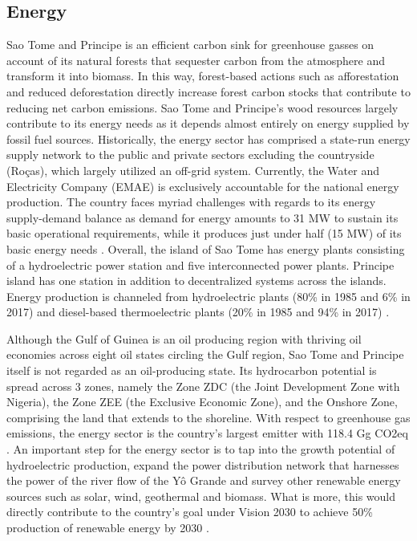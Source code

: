 \documentclass[
]{book}
\begin{document}
\hypertarget{energy}{%
\subsection{Energy}\label{energy}}

Sao Tome and Principe is an efficient carbon sink for greenhouse gasses on account of its natural forests that sequester carbon from the atmosphere and transform it into biomass. In this way, forest-based actions such as afforestation and reduced deforestation directly increase forest carbon stocks that contribute to reducing net carbon emissions. Sao Tome and Principe's wood resources largely contribute to its energy needs as it depends almost entirely on energy supplied by fossil fuel sources. Historically, the energy sector has comprised a state-run energy supply network to the public and private sectors excluding the countryside (Roças), which largely utilized an off-grid system. Currently, the Water and Electricity Company (EMAE) is exclusively accountable for the national energy production. The country faces myriad challenges with regards to its energy supply-demand balance as demand for energy amounts to 31 MW to sustain its basic operational requirements, while it produces just under half (15 MW) of its basic energy needs . Overall, the island of Sao Tome has energy plants consisting of a hydroelectric power station and five interconnected power plants. Principe island has one station in addition to decentralized systems across the islands. Energy production is channeled from hydroelectric plants (80\% in 1985 and 6\% in 2017) and diesel-based thermoelectric plants (20\% in 1985 and 94\% in 2017) .

Although the Gulf of Guinea is an oil producing region with thriving oil economies across eight oil states circling the Gulf region, Sao Tome and Principe itself is not regarded as an oil-producing state. Its hydrocarbon potential is spread across 3 zones, namely the Zone ZDC (the Joint Development Zone with Nigeria), the Zone ZEE (the Exclusive Economic Zone), and the Onshore Zone, comprising the land that extends to the shoreline. With respect to greenhouse gas emissions, the energy sector is the country's largest emitter with 118.4 Gg CO2eq . An important step for the energy sector is to tap into the growth potential of hydroelectric production, expand the power distribution network that harnesses the power of the river flow of the Yô Grande and survey other renewable energy sources such as solar, wind, geothermal and biomass. What is more, this would directly contribute to the country's goal under Vision 2030 to achieve 50\% production of renewable energy by 2030 .
\end{document}

